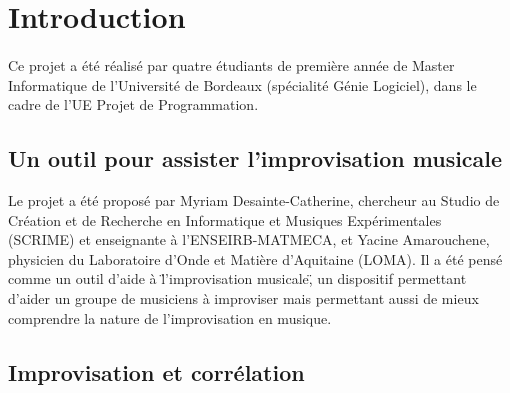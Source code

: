 
\section{Introduction}
\paragraph{}
Ce projet a été réalisé par quatre étudiants de première année de
Master Informatique de l'Université de Bordeaux (spécialité Génie
Logiciel), dans le cadre de l'UE Projet de Programmation.

\subsection{Un outil pour assister l'improvisation musicale}
Le projet a été proposé par Myriam Desainte-Catherine, chercheur au
Studio de Création et de Recherche en Informatique et Musiques
Expérimentales (SCRIME) et enseignante à l'ENSEIRB-MATMECA, et Yacine
Amarouchene, physicien du Laboratoire d'Onde et Matière d'Aquitaine
(LOMA). Il a été pensé comme un outil d'aide à \"l'improvisation
musicale\", un dispositif permettant d'aider un groupe de musiciens à
improviser mais permettant aussi de mieux comprendre la nature de
l'improvisation en musique.

\subsection{Improvisation et corrélation}
